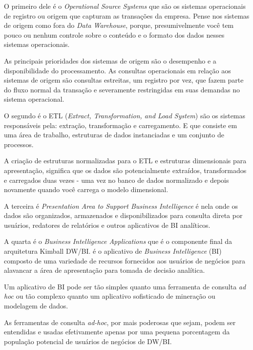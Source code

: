 O primeiro dele \'{e} o \textit{Operational Source Systems} que s\~{a}o os sistemas operacionais de registro ou origem que capturam as transa\c{c}\~{o}es da empresa. Pense nos sistemas de origem como fora do \textit{Data Warehouse}, porque, presumivelmente voc\^{e} tem pouco ou nenhum controle sobre o conteúdo e o formato dos dados nesses sistemas operacionais. 

As principais prioridades dos sistemas de origem s\~{a}o o desempenho e a disponibilidade do processamento. As consultas operacionais em rela\c{c}\~{a}o aos sistemas de origem s\~{a}o consultas estreitas, um registro por vez, que fazem parte do fluxo normal da transa\c{c}\~{a}o e severamente restringidas em suas demandas no sistema operacional.

O segundo \'{e} o ETL (\textit{Extract, Transformation, and Load System}) s\~{a}o os sistemas respons\'{a}veis pela: extra\c{c}\~{a}o, transforma\c{c}\~{a}o e carregamento. E que consiste em uma \'{a}rea de trabalho, estruturas de dados instanciadas e um conjunto de processos.

A cria\c{c}\~{a}o de estruturas normalizadas para o ETL e estruturas dimensionais para apresenta\c{c}\~{a}o, significa que os dados s\~{a}o potencialmente extra\'{i}dos, transformados e carregados duas vezes - uma vez no banco de dados normalizado e depois novamente quando voc\^{e} carrega o modelo dimensional. 

A terceira \'{e} \textit{Presentation Area to Support Business Intelligence} \'{e} nela onde os dados s\~{a}o organizados, armazenados e disponibilizados para consulta direta por usu\'{a}rios, redatores de relat\'{o}rios e outros aplicativos de BI anal\'{i}ticos.

A quarta \'{e} o \textit{Business Intelligence Applications} que \'{e} o componente final da arquitetura Kimball DW/BI. \'{e} o aplicativo de \textit{Business Intelligence} (BI) composto de uma variedade de recursos fornecidos aos usu\'{a}rios de neg\'{o}cios para alavancar a \'{a}rea de apresenta\c{c}\~{a}o para tomada de decis\~{a}o anal\'{i}tica.

Um aplicativo de BI pode ser t\~{a}o simples quanto uma ferramenta de consulta \textit{ad hoc} ou t\~{a}o complexo quanto um aplicativo sofisticado de minera\c{c}\~{a}o ou modelagem de dados. 

As ferramentas de consulta \textit{ad-hoc}, por mais poderosas que sejam, podem ser entendidas e usadas efetivamente apenas por uma pequena porcentagem da popula\c{c}\~{a}o potencial de usu\'{a}rios de neg\'{o}cios de DW/BI. 

